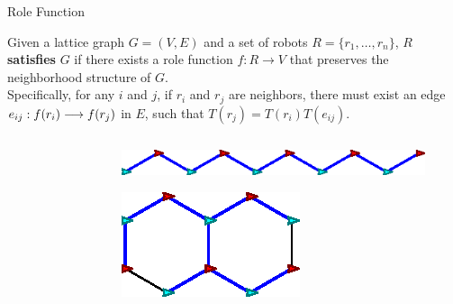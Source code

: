 \begin{frame}{Role Function}
  \begin{definition}
    \small{Given a lattice graph $G=(V, E)$ and a set of robots $R = \{
    r_1, \ldots, r_n \}$, $R$ \textbf{satisfies} $G$ if
    there exists a role function $f: R \rightarrow V$ that preserves
    the neighborhood structure of $G$.
    \\
    Specifically, for any $i$ and $j$, if $r_i$ and $r_j$ are neighbors, 
    there must exist an edge
    $e_{ij}: {f(r_i)}\overset{}{\longrightarrow}{f(r_j)}$ in $E$, such that
    $ T(r_j) = T(r_i) T(e_{ij})$.}
  \end{definition}
  \begin{columns}[T] 
    \begin{column}{.4\textwidth}
      \begin{figure}
        \centering
      \end{figure}
    \end{column}%
    \begin{column}{.5\textwidth}
      \begin{figure}
        \centering
        \includegraphics[width=0.75\linewidth]{figs/bad-hexagon}
      \end{figure}
      \begin{figure}
        \centering
        \includegraphics[scale=0.8]{figs/good-hexagon}
        \end{figure}
    \end{column}%
  \end{columns}
\end{frame}

